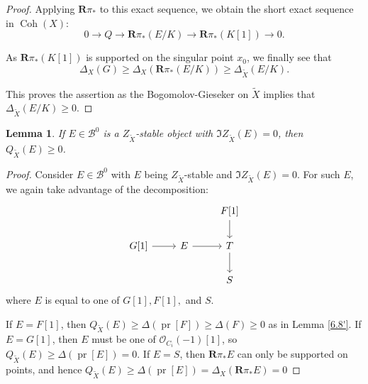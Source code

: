 \documentclass[12pt]{amsart}
\newtheorem{lemma}[theorem]{Lemma}
\theoremstyle{definition}
\DeclareMathOperator{\Coh}{Coh}
\DeclareMathOperator{\pr}{pr}
\begin{document}
\begin{proof}
Applying $\mathbf{R}\pi_\ast$ to this exact sequence,
we obtain the short exact sequence in $\Coh(X)$:
\[ 0 \longrightarrow Q \longrightarrow \mathbf{R}\pi_\ast(E/K) \longrightarrow \mathbf{R}\pi_\ast(K[1])
\longrightarrow 0.\]

As $\mathbf{R}\pi_\ast(K[1])$ is supported on the singular point $x_0$, we finally see that
\[\Delta_X(G)\geq \Delta_X(\mathbf{R}\pi_\ast(E/K))\geq \Delta_{\widetilde{X}}(E/K).\]

This proves the assertion as the Bogomolov-Gieseker on $\widetilde{X}$ implies that $\Delta_{\widetilde{X}}(E/K)\geq 0$.
\end{proof}


\begin{lemma}\label{I=0}
If $E \in \mathcal{B}^0$ is a $Z_{\widetilde{X}}$-stable object with $\Im Z_{\widetilde{X}}(E)=0$,
then $Q_{\widetilde{X}}(E) \geq 0$.
\end{lemma}
\begin{proof}
Consider $E \in \mathcal{B}^0$ with $E$ being $Z_{\widetilde{X}}$-stable and $\Im Z_{\widetilde{X}}(E) = 0$.
For such $E$, we again take advantage of the decomposition:
\[\begin{tikzcd}
                 &             & {F[1]} \arrow[d] \\
{G[1]} \arrow[r] & E \arrow[r] & T \arrow[d]      \\
                 &             & S               
\end{tikzcd}\]
where $E$ is equal to one of $G[1], F[1],$ and $S$.

If $E=F[1]$, then $Q_{\widetilde{X}}(E)\geq \Delta(\pr [F]) \geq \Delta(F) \geq 0$ as in Lemma \ref{6.8'}.
If $E=G[1]$, then $E$ must be one of $\mathcal{O}_{C_i}(-1)[1]$, so $Q_{\widetilde{X}}(E)\geq \Delta(\pr [E]) = 0$.
If $E=S$, then $\mathbf{R}\pi_\ast E$ can only be supported on points, and hence $Q_{\widetilde{X}}(E)\geq \Delta(\pr [E]) = \Delta_X(\mathbf{R}\pi_\ast E)=0$
\end{proof}
\end{document}
